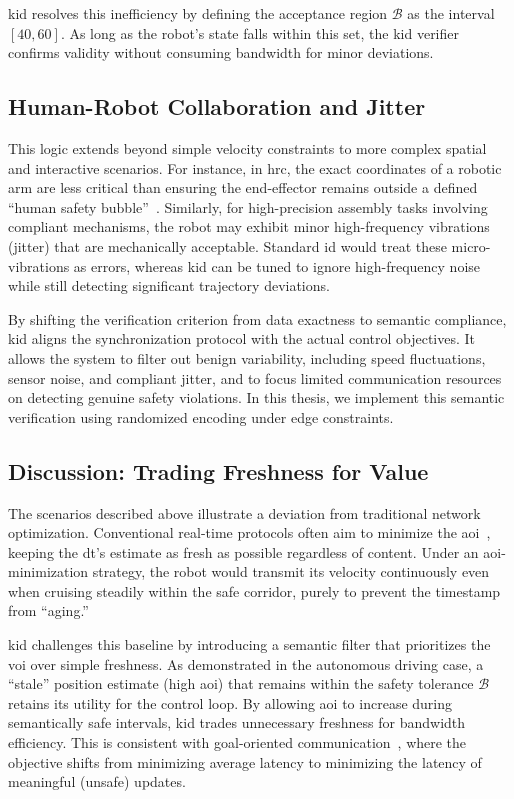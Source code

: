 \gls{kid} resolves this inefficiency by defining the acceptance region $\mathcal{B}$ as the interval $[40, 60]$. As long as the robot's state falls within this set, the \gls{kid} verifier confirms validity without consuming bandwidth for minor deviations.

\subsection{Human-Robot Collaboration and Jitter}
This logic extends beyond simple velocity constraints to more complex spatial and interactive scenarios. For instance, in \gls{hrc}, the exact coordinates of a robotic arm are less critical than ensuring the end-effector remains outside a defined ``human safety bubble''~\cite{9013428}. Similarly, for high-precision assembly tasks involving compliant mechanisms, the robot may exhibit minor high-frequency vibrations (jitter) that are mechanically acceptable. Standard \gls{id} would treat these micro-vibrations as errors, whereas \gls{kid} can be tuned to ignore high-frequency noise while still detecting significant trajectory deviations.

By shifting the verification criterion from data exactness to semantic compliance, \gls{kid} aligns the synchronization protocol with the actual control objectives. It allows the system to filter out benign variability, including speed fluctuations, sensor noise, and compliant jitter, and to focus limited communication resources on detecting genuine safety violations. In this thesis, we implement this semantic verification using randomized encoding under edge constraints.

\subsection{Discussion: Trading Freshness for Value}
\label{subsec:aoi_voi_tradeoff}

The scenarios described above illustrate a deviation from traditional network optimization. Conventional real-time protocols often aim to minimize the \gls{aoi}~\cite{kaul2012real}, keeping the \gls{dt}'s estimate as fresh as possible regardless of content. Under an \gls{aoi}-minimization strategy, the robot would transmit its velocity continuously even when cruising steadily within the safe corridor, purely to prevent the timestamp from ``aging.''

\gls{kid} challenges this baseline by introducing a semantic filter that prioritizes the \gls{voi} over simple freshness. As demonstrated in the autonomous driving case, a ``stale'' position estimate (high \gls{aoi}) that remains within the safety tolerance $\mathcal{B}$ retains its utility for the control loop. By allowing \gls{aoi} to increase during semantically safe intervals, \gls{kid} trades unnecessary freshness for bandwidth efficiency. This is consistent with goal-oriented communication~\cite{strinati2024goal}, where the objective shifts from minimizing average latency to minimizing the latency of meaningful (unsafe) updates.

